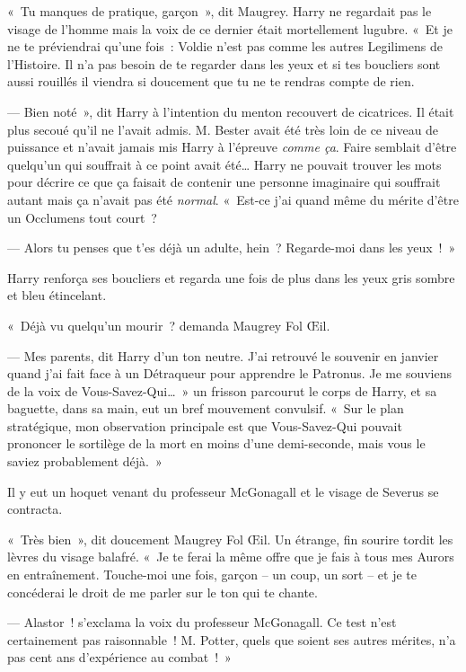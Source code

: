 «~Tu manques de pratique, garçon~», dit Maugrey.
Harry ne regardait pas le visage de l'homme mais la voix de ce dernier était mortellement lugubre.
«~Et je ne te préviendrai qu'une fois~: Voldie n'est pas comme les autres Legilimens de l'Histoire.
Il n'a pas besoin de te regarder dans les yeux et si tes boucliers sont aussi rouillés il viendra si doucement que tu ne te rendras compte de rien.

--- Bien noté~», dit Harry à l'intention du menton recouvert de cicatrices.
Il était plus secoué qu'il ne l'avait admis.
M. Bester avait été très loin de ce niveau de puissance et n'avait jamais mis Harry à l'épreuve \emph{comme ça}.
Faire semblait d'être quelqu'un qui souffrait à ce point avait été…
Harry ne pouvait trouver les mots pour décrire ce que ça faisait de contenir une personne imaginaire qui souffrait autant mais ça n'avait pas été \emph{normal}.
«~Est-ce j'ai quand même du mérite d'être un Occlumens tout court~?

--- Alors tu penses que t'es déjà un adulte, hein~?
Regarde-moi dans les yeux~!~»

Harry renforça ses boucliers et regarda une fois de plus dans les yeux gris sombre et bleu étincelant.

«~Déjà vu quelqu'un mourir~? demanda Maugrey Fol Œil.

--- Mes parents, dit Harry d'un ton neutre.
J'ai retrouvé le souvenir en janvier quand j'ai fait face à un Détraqueur pour apprendre le Patronus.
Je me souviens de la voix de Vous-Savez-Qui…~»
un frisson parcourut le corps de Harry, et sa baguette, dans sa main, eut un bref mouvement convulsif.
«~Sur le plan stratégique, mon observation principale est que Vous-Savez-Qui pouvait prononcer le sortilège de la mort en moins d'une demi-seconde, mais vous le saviez probablement déjà.~»

Il y eut un hoquet venant du professeur McGonagall et le visage de Severus se contracta.

«~Très bien~», dit doucement Maugrey Fol Œil.
Un étrange, fin sourire tordit les lèvres du visage balafré.
«~Je te ferai la même offre que je fais à tous mes Aurors en entraînement.
Touche-moi une fois, garçon -- un coup, un sort -- et je te concéderai le droit de me parler sur le ton qui te chante.

--- Alastor~! s'exclama la voix du professeur McGonagall.
Ce test n'est certainement pas raisonnable~!
M. Potter, quels que soient ses autres mérites, n'a pas cent ans d'expérience au combat~!~»

